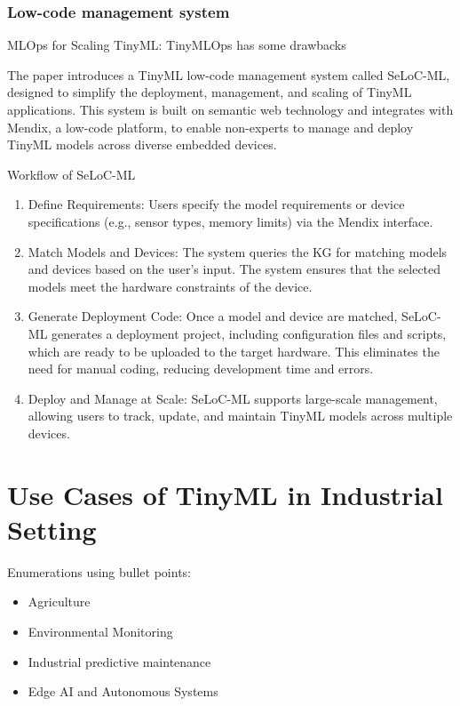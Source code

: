 \documentclass[twocolumn]{article}
\begin{document}
\subsubsection{Low-code management system}


MLOps for Scaling TinyML: TinyMLOps has some drawbacks

The paper introduces a TinyML low-code management system called SeLoC-ML, designed to simplify the deployment, management, and scaling of TinyML applications. This system is built on semantic web technology and integrates with Mendix, a low-code platform, to enable non-experts to manage and deploy TinyML models across diverse embedded devices.

Workflow of SeLoC-ML

\begin{enumerate}
	\item Define Requirements: Users specify the model requirements or device specifications (e.g., sensor types, memory limits) via the Mendix interface.
	\item	Match Models and Devices: The system queries the KG for matching models and devices based on the user’s input. The system ensures that the selected models meet the hardware constraints of the device.
	\item	Generate Deployment Code: Once a model and device are matched, SeLoC-ML generates a deployment project, including configuration files and scripts, which are ready to be uploaded to the target hardware. This eliminates the need for manual coding, reducing development time and errors.
	\item	Deploy and Manage at Scale: SeLoC-ML supports large-scale management, allowing users to track, update, and maintain TinyML models across multiple devices.
\end{enumerate}


\section{Use Cases of TinyML in Industrial Setting}
\label{use_cases}

Enumerations using bullet points:

\begin{itemize}
	\item 	Agriculture
	\item 	Environmental Monitoring
	\item 	Industrial predictive maintenance
	\item 	Edge AI and Autonomous Systems
\end{itemize}
\end{document}
